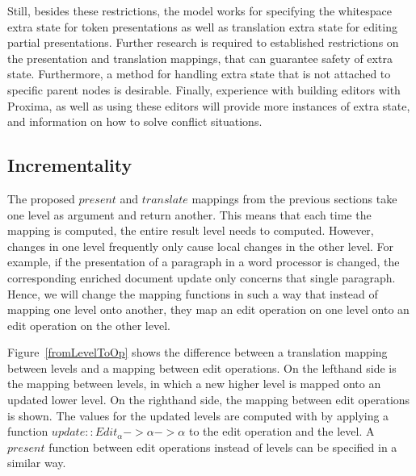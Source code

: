 Still, besides these restrictions, the model works for specifying the whitespace extra state for token presentations as well as translation extra state for editing partial presentations. Further research is required to established restrictions on the presentation and translation mappings, that can guarantee safety of extra state. Furthermore, a method for handling extra state that is not attached to specific parent nodes is desirable. Finally, experience with building editors with Proxima, as well as using these editors will provide more instances of extra state, and information on how to solve conflict situations.







%										
%										
%										
\subsection{Incrementality}

The proposed $present$ and $translate$ mappings from the previous sections take one level as argument and return another. This means that each time the mapping is computed, the entire result level needs to computed. However, changes in one level frequently only cause local changes in the other level. For example, if the presentation of a paragraph in a word processor is changed, the corresponding enriched document update only concerns that single paragraph. Hence, we will change the mapping functions in such a way that instead of mapping one level onto another, they map an edit operation on one level onto an edit operation on the other level. 

Figure~\ref{fromLevelToOp} shows the difference between a translation mapping between levels and a mapping between edit operations. On the lefthand side is the mapping between levels, in which a new higher level is mapped onto an updated lower level. On the righthand side, the mapping between edit operations is shown. The values for the updated levels are computed with by applying a function
 $update :: Edit_\alpha -> \alpha -> \alpha$ to the edit operation and the level. A $present$ function between edit operations instead of levels can be specified in a similar way.

